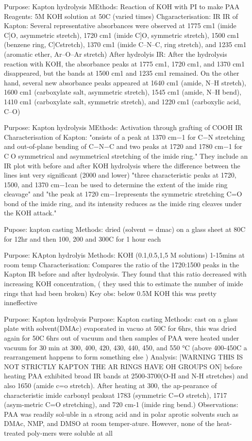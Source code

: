 \cite{dow2010modification}
Purpose: Kapton hydrolysis
MEthods: Reaction of KOH with PI to make PAA
Reagents: 5M KOH solution at 50C (varied times)
Chgaracterisation: IR
IR of Kapton:  Several representative absorbances were observed at 1775 cm1 (imide C]O, asymmetric stretch), 1720 cm1 (imide C]O, symmetric stretch), 1500 cm1 (benzene ring, C]Cstretch), 1370 cm1 (imide C–N–C, ring stretch), and 1235 cm1 (aromatic ether, Ar–O–Ar stretch)
After hydrolyis IR: After the hydrolysis reaction with KOH, the absorbance peaks at 1775 cm1, 1720 cm1, and 1370 cm1 disappeared, but the bands at 1500 cm1 and 1235 cm1 remained. On the other hand, several new absorbance peaks appeared at 1640 cm1 (amide, N–H stretch), 1600 cm1 (carboxylate salt, asymmetric stretch), 1545 cm1 (amide, N–H bend), 1410 cm1 (carboxylate salt, symmetric stretch), and 1220 cm1 (carboxylic acid, C–O)

\cite{liu2019efficient}
Purpose: Kapton hydrolysis
MEthods: Activation through grafting of COOH
IR Characterisation of Kapton: "onsists of a peak at 1370 cm−1 for C−N stretching and out-of-plane bending of C−N−C and two peaks at 1720 and 1780 cm−1 for CO symmetrical and asymmetrical stretching of the imide ring."
They include an IR plot with before and after KOH hydrolysis where the difference between the lines isnt very significant (2000 and lower) "three characteristic peaks at 1720, 1500, and 1370 cm−1can be used to determine the extent of the imide ring cleavage" and "the peak at 1720 cm−1represents the symmetric stretching C=O bond of the imide ring, and its intensity reduces as the imide ring cleaves under the KOH attack."

\cite{liu2019efficient}
Pupose: kapton casting
Methods: dried (solvent = dmac) on a glass sheet at 80C for 12hr and then 100, 200 and 300C for 1 hour each


\cite{wu2017study}
Purpose: KApton hydrolyis
Methods: KOH (0.1,0.5,1,5 M solutions) 1-15mins at room temp
Characterisation: Compares the ratio of the 1720:1500 peaks in the Kapton IR before and after hydrolysis. They found that this ratio decreased with increasing KOH concentration, ( they used this to estimate the number of imide rings that had been broken)
Key obs: below 0.5M KOH this was pretty inneffective


\cite{chang2000two}
Purpose: Kapton hydrolysis
\cite{chang2000two}
Purpose: Kapton casting
Methods: cast on a glass plate with solvent(DMAc) evaporated in vacuo at 50C for 6hrs, this was dried again for 50C 6hrs out of vacuum and then samples of PAA were heated under vacuum for 30 min at 300, 400, 420, 430, 440, 450, and 550 °C (above 400-450C a rearrangement happens to form something else )
Analysis: [WARNING THIS IS NOT STRICTLY KAPTON THE AR RINGS HAVE OH GROUPS ON] before heating PAA exhibited broad IR bands at 2500-3700(O-H and N-H stretches) and also 1650 (amide c=o stretch). After heating at 300, the ap-pearance of characteristic imide carbonyl peaksat 1783 (symmetric C=O stretch), 1717 (asym-metric C=O stretching), and 720 cm-1 (imide ring bend.)
Observations: PAA was readily sol-uble in a strong acid and in polar aprotic solvents such as DMAc, NMP, and DMSO at room temper-ature. However, none of the heat-treated poly-mers were soluble at all



